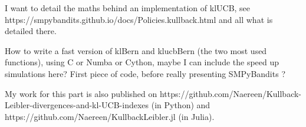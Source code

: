 I want to detail the maths behind an implementation of klUCB, see https://smpybandits.github.io/docs/Policies.kullback.html and all what is detailed there.

How to write a fast version of klBern and klucbBern (the two most used functions), using C or Numba or Cython, maybe I can include the speed up simulations here? First piece of code, before really presenting SMPyBandits ?

My work for this part is also published on https://github.com/Naereen/Kullback-Leibler-divergences-and-kl-UCB-indexes
(in Python) and https://github.com/Naereen/KullbackLeibler.jl (in Julia).

